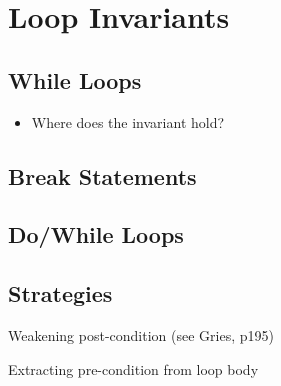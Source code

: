 \section{Loop Invariants}

\subsection{While Loops}
\begin{itemize}
\item Where does the invariant hold?
\end{itemize}
\subsection{Break Statements}
\subsection{Do/While Loops}
\subsection{Strategies}
\begin{enumeration}
\item Weakening post-condition (see Gries, p195)
\item Extracting pre-condition from loop body
\end{enumeration}